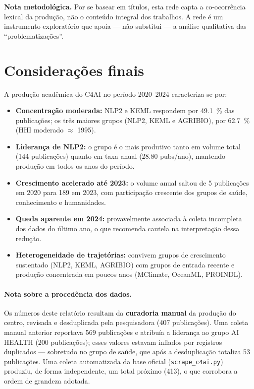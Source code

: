 \documentclass[12pt,a4paper]{article}
\begin{document}
\noindent
\textbf{Nota metodológica.} Por se basear em títulos, esta rede capta a
co-ocorrência lexical da produção, não o conteúdo integral dos trabalhos. A
rede é um instrumento exploratório que apoia --- não substitui --- a análise
qualitativa das ``problematizações''.

\section{Considerações finais}

A produção acadêmica do C4AI no período 2020--2024 caracteriza-se por:
\begin{itemize}
    \item \textbf{Concentração moderada:} NLP2 e KEML respondem por
          \SI{49.1}{\percent} das publicações; os três maiores grupos (NLP2,
          KEML e AGRIBIO), por \SI{62.7}{\percent} (HHI moderado $\approx$
          \num{1995}).
    \item \textbf{Liderança de NLP2:} o grupo é o mais produtivo tanto em volume
          total (\num{144} publicações) quanto em taxa anual (\num{28.80}
          pubs/ano), mantendo produção em todos os anos do período.
    \item \textbf{Crescimento acelerado até 2023:} o volume anual saltou de
          \num{5} publicações em 2020 para \num{189} em 2023, com participação
          crescente dos grupos de saúde, conhecimento e humanidades.
    \item \textbf{Queda aparente em 2024:} provavelmente associada à coleta
          incompleta dos dados do último ano, o que recomenda cautela na
          interpretação dessa redução.
    \item \textbf{Heterogeneidade de trajetórias:} convivem grupos de
          crescimento sustentado (NLP2, KEML, AGRIBIO) com grupos de entrada
          recente e produção concentrada em poucos anos (MClimate, OceanML,
          PROINDL).
\end{itemize}

\paragraph{Nota sobre a procedência dos dados.}
Os números deste relatório resultam da \textbf{curadoria manual} da produção do
centro, revisada e desduplicada pela pesquisadora (\num{407} publicações). Uma
coleta manual anterior reportava \num{569} publicações e atribuía a liderança ao
grupo AI HEALTH (\num{200} publicações); esses valores estavam inflados por
registros duplicados --- sobretudo no grupo de saúde, que após a desduplicação
totaliza \num{53} publicações. Uma coleta automatizada da base oficial
(\texttt{scrape\_c4ai.py}) produziu, de forma independente, um total próximo
(\num{413}), o que corrobora a ordem de grandeza adotada.
\end{document}
